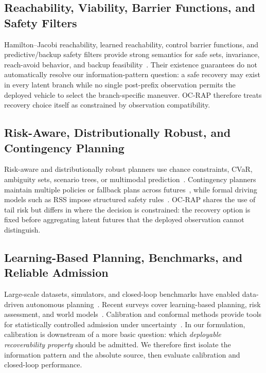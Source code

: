 \documentclass[conference]{IEEEtran}
\begin{document}
\subsection{Reachability, Viability, Barrier Functions, and Safety Filters}
Hamilton--Jacobi reachability, learned reachability, control barrier functions, and predictive/backup safety filters provide strong semantics for safe sets, invariance, reach-avoid behavior, and backup feasibility~\cite{bansal2017hamilton,bansal2021deepreach,lin2023generating,borquez2022parameter,ames2019control,koller2018learning,wabersich2021predictive,tearle2021predictive,kim2026backup,so2023solving}. Their existence guarantees do not automatically resolve our information-pattern question: a safe recovery may exist in every latent branch while no single post-prefix observation permits the deployed vehicle to select the branch-specific maneuver. OC-RAP therefore treats recovery choice itself as constrained by observation compatibility.

\subsection{Risk-Aware, Distributionally Robust, and Contingency Planning}
Risk-aware and distributionally robust planners use chance constraints, CVaR, ambiguity sets, scenario trees, or multimodal prediction~\cite{uryasev2000conditional,hakobyan2021wasserstein,safaoui2024distributionally,batkovic2020robust,nair2024predictive}. Contingency planners maintain multiple policies or fallback plans across futures~\cite{li2023marc,mustafa2024racp}, while formal driving models such as RSS impose structured safety rules~\cite{shalev2017formal}. OC-RAP shares the use of tail risk but differs in where the decision is constrained: the recovery option is fixed before aggregating latent futures that the deployed observation cannot distinguish.

\subsection{Learning-Based Planning, Benchmarks, and Reliable Admission}
Large-scale datasets, simulators, and closed-loop benchmarks have enabled data-driven autonomous planning~\cite{dosovitskiy2017carla,caesar2021nuplan,li2022metadrive,ettinger2021large,wilson2023argoverse,zhan2019interaction,althoff2017commonroad,krajewski2018highd,caesar2020nuscenes}. Recent surveys cover learning-based planning, risk assessment, and world models~\cite{ding2025understanding,lu2025risk,hu2025survey}. Calibration and conformal methods provide tools for statistically controlled admission under uncertainty~\cite{vovk2005algorithmic,stephen2021gentle,angelopoulos2024conformal,lekeufack2024conformal,strawn2023conformal}. In our formulation, calibration is downstream of a more basic question: which \emph{deployable recoverability property} should be admitted. We therefore first isolate the information pattern and the absolute source, then evaluate calibration and closed-loop performance.
\end{document}
